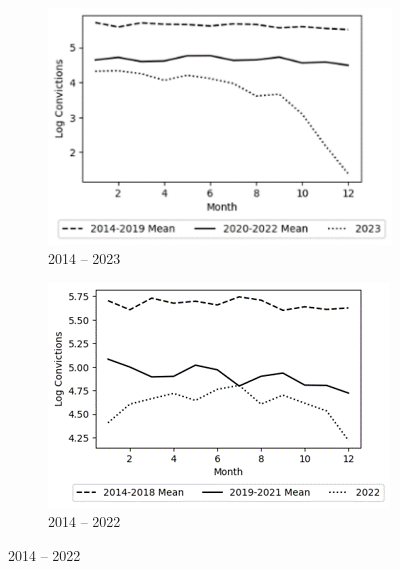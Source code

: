 \begin{figure}[htbp]
  \centering
  \caption{Monthly Log Total Of SFDA Convictions}
  \begin{subfigure}[b]{0.48\textwidth}
    \includegraphics[width=\textwidth]{graphs/sfda_action_graphs/Monthly Log Total Of Convictions A.png}
    \caption*{2014 – 2023}
    \label{subfig:left_c}
  \end{subfigure}
  \hfill
  \begin{subfigure}[b]{0.48\textwidth}
    \includegraphics[width=\textwidth]{graphs/sfda_action_graphs/Monthly Log Total Of Convictions B.png}
    \caption*{2014 – 2022}
    \label{subfig:right_c}
  \end{subfigure}
  \label{fig:overall_c}
\end{figure}